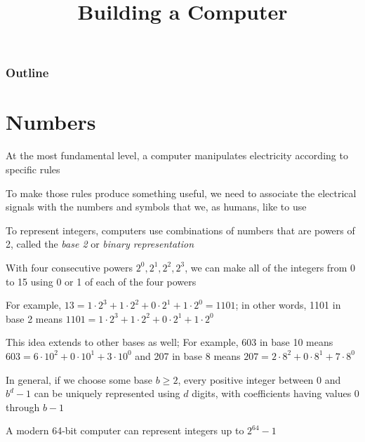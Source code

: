 \documentclass[8pt,a4paper,compress]{beamer}
\title{Building a Computer}
\date{}
\begin{document}
\begin{frame}
\vfill
\titlepage
\end{frame}

\begin{frame}
\frametitle{Outline}
\tableofcontents
\end{frame}

\section{Numbers}
\begin{frame}[fragile]
At the most fundamental level, a computer manipulates electricity according to specific rules

\bigskip

To make those rules produce something useful, we need to associate the electrical signals with the numbers and symbols that we, as humans, like to use

\bigskip

To represent integers, computers use combinations of numbers that are powers of 2, called the \emph{base 2} or \emph{binary representation}

\bigskip

With four consecutive powers $2^0, 2^1, 2^2, 2^3$, we can make all of the integers from 0 to 15 using 0 or 1 of each of the four powers

\bigskip

For example, $13 = 1 \cdot 2^3 + 1 \cdot 2^2 + 0 \cdot 2^1 + 1 \cdot 2^0 = 1101$; in other words, 1101 in base 2 means $1101 = 1 \cdot 2^3 + 1 \cdot 2^2 + 0 \cdot 2^1 + 1 \cdot 2^0$

\bigskip

This idea extends to other bases as well; For example, 603 in base 10 means $603 = 6 \cdot 10^2 + 0 \cdot 10^1 + 3 \cdot 10^0$ and 207 in base 8 means $207 = 2 \cdot 8^2 + 0 \cdot 8^1 + 7 \cdot 8^0$

\bigskip

In general, if we choose some base $b \geq 2$, every positive integer between 0 and $b^d-1$ can be uniquely represented using $d$ digits, with coefficients having values 0 through $b-1$

\bigskip

A modern 64-bit computer can represent integers up to $2^{64} - 1$
\end{frame}
\end{document}
